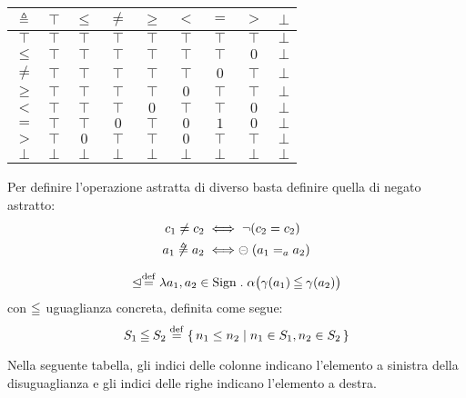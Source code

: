 \begin{center}
  \begin{tabular}{ c | c c c c c c c c }
    $\mathrel{\triangleq}$ & $\top$ & $\leq$ & $\neq$ & $\geq$ & $<$ & $=$ & $>$ & $\bot$ \\
    \hline
    $\top$ & $\top$ & $\top$ & $\top$ & $\top$ & $\top$ & $\top$ & $\top$ & $\bot$ \\
    $\leq$ & $\top$ & $\top$ & $\top$ & $\top$ & $\top$ & $\top$ & $0$ & $\bot$\\
    $\neq$ & $\top$ & $\top$ & $\top$ & $\top$ & $\top$ & $0$ & $\top$ & $\bot$\\
    $\geq$ & $\top$ & $\top$ & $\top$ & $\top$ & $0$ & $\top$ & $\top$ & $\bot$\\
    $<$ & $\top$ & $\top$ & $\top$ & $0$ & $\top$ & $\top$ & $0$ & $\bot$\\
    $=$ & $\top$ & $\top$ & $0$ & $\top$ & $0$ & $1$ & $0$ & $\bot$\\
    $>$ & $\top$ & $0$ & $\top$ & $\top$ & $0$ & $\top$ & $\top$ & $\bot$\\
    $\bot$ & $\bot$ & $\bot$ & $\bot$ & $\bot$ & $\bot$ & $\bot$ & $\bot$ & $\bot$
  \end{tabular}
\end{center}


\begin{definizione}
Per definire l'operazione astratta di diverso basta definire quella di negato astratto:
\begin{align*}
  c_1 \neq c_2 &\iff \neg (c_2 = c_2) \\
  a_1 \mathrel{\not\triangleq} a_2 &\iff \mathrel{\circleddash} (a_1 =_a a_2)
\end{align*}
\end{definizione}

\begin{definizione}
\[
  \absleq \defeq \lambda a_1,a_2 \in \Sign \st \alpha\bigl(\gamma(a_1) \conineq \gamma(a_2)\bigr)
\]
con $\mathbin{\leqq}$ uguaglianza concreta, definita come segue:
\[
  S_1 \conineq S_2 \defeq \{\, n_1 \leq n_2 \mid n_1 \in S_1, n_2 \in S_2 \,\}
\]
\end{definizione}
Nella seguente tabella, gli indici delle colonne indicano
l'elemento a sinistra della disuguaglianza e gli indici delle righe
indicano l'elemento a destra.

